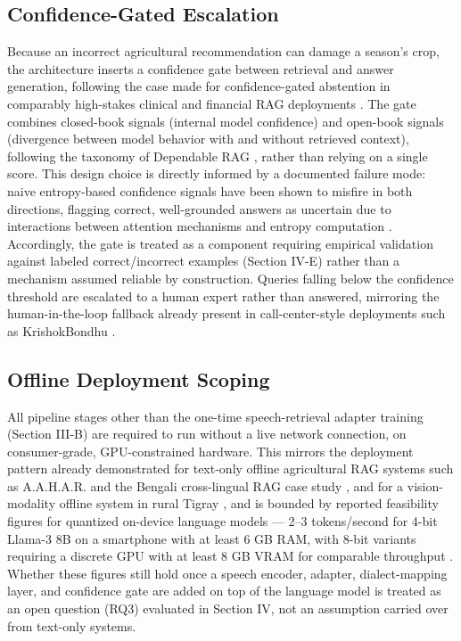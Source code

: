 \documentclass[conference]{IEEEtran}
\begin{document}
\subsection{Confidence-Gated Escalation}
Because an incorrect agricultural recommendation can damage a season's crop, the architecture inserts a confidence gate between retrieval and answer generation, following the case made for confidence-gated abstention in comparably high-stakes clinical and financial RAG deployments \cite{abstinence2025}. The gate combines closed-book signals (internal model confidence) and open-book signals (divergence between model behavior with and without retrieved context), following the taxonomy of Dependable RAG \cite{dependablerag2026}, rather than relying on a single score. This design choice is directly informed by a documented failure mode: naive entropy-based confidence signals have been shown to misfire in both directions, flagging correct, well-grounded answers as uncertain due to interactions between attention mechanisms and entropy computation \cite{intrygue2026}. Accordingly, the gate is treated as a component requiring empirical validation against labeled correct/incorrect examples (Section IV-E) rather than a mechanism assumed reliable by construction. Queries falling below the confidence threshold are escalated to a human expert rather than answered, mirroring the human-in-the-loop fallback already present in call-center-style deployments such as KrishokBondhu \cite{ameen2026krishokbondhu}.

\subsection{Offline Deployment Scoping}
All pipeline stages other than the one-time speech-retrieval adapter training (Section III-B) are required to run without a live network connection, on consumer-grade, GPU-constrained hardware. This mirrors the deployment pattern already demonstrated for text-only offline agricultural RAG systems such as A.A.H.A.R. \cite{dubey2025aahar} and the Bengali cross-lingual RAG case study \cite{hossain2026bengalirag}, and for a vision-modality offline system in rural Tigray \cite{tigray2025plantdisease}, and is bounded by reported feasibility figures for quantized on-device language models --- 2--3 tokens/second for 4-bit Llama-3 8B on a smartphone with at least 6 GB RAM, with 8-bit variants requiring a discrete GPU with at least 8 GB VRAM for comparable throughput \cite{compactllm2026}. Whether these figures still hold once a speech encoder, adapter, dialect-mapping layer, and confidence gate are added on top of the language model is treated as an open question (RQ3) evaluated in Section IV, not an assumption carried over from text-only systems.
\end{document}
